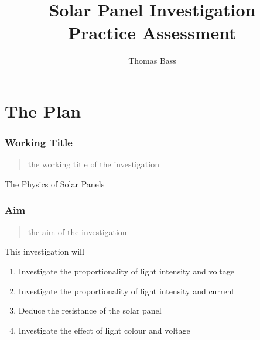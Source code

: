 \documentclass{article}
\title{Solar Panel Investigation \\ Practice Assessment}
\author{Thomas Bass}
\begin{document}
\maketitle


\part{The Plan}

\section{Working Title}
\begin{quote}
the working title of the investigation
\end{quote}
The Physics of Solar Panels

\section{Aim}
\begin{quote}
the aim of the investigation
\end{quote}
This investigation will
\begin{enumerate}
  \item Investigate the proportionality of light intensity and voltage
  \item Investigate the proportionality of light intensity and current
  \item Deduce the resistance of the solar panel
  \item Investigate the effect of light colour and voltage
\end{enumerate}
\end{document}

